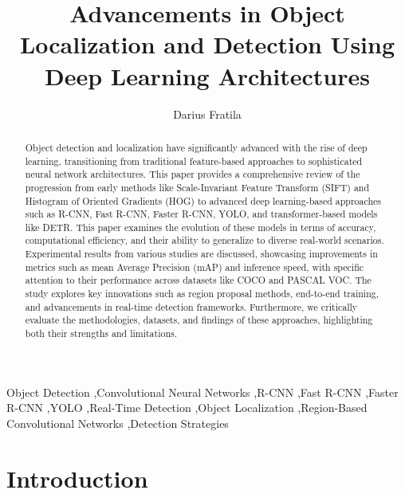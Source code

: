 \documentclass[3p,times]{elsarticle}
\begin{document}
    
\begin{frontmatter}


\title{\textbf{Advancements in Object Localization and Detection Using Deep Learning Architectures}}

\author{Darius Fratila} 

\address{Department of Computer Science, Babe\c s-Bolyai University\\1, M. Kogalniceanu Street, 400084, Cluj-Napoca, Romania\\E-mail: darius.fratila@stud.ubbcluj.ro}
\begin{abstract}
Object detection and localization have significantly advanced with the rise of deep learning, transitioning from traditional feature-based approaches to sophisticated neural network architectures. This paper provides a comprehensive review of the progression from early methods like Scale-Invariant Feature Transform (SIFT) and Histogram of Oriented Gradients (HOG) to advanced deep learning-based approaches such as R-CNN, Fast R-CNN, Faster R-CNN, YOLO, and transformer-based models like DETR. This paper examines the evolution of these models in terms of accuracy, computational efficiency, and their ability to generalize to diverse real-world scenarios. Experimental results from various studies are discussed, showcasing improvements in metrics such as mean Average Precision (mAP) and inference speed, with specific attention to their performance across datasets like COCO and PASCAL VOC. The study explores key innovations such as region proposal methods, end-to-end training, and advancements in real-time detection frameworks. Furthermore, we critically evaluate the methodologies, datasets, and findings of these approaches, highlighting both their strengths and limitations.

\end{abstract}

\begin{keyword} 
Object Detection \sep Convolutional Neural Networks \sep R-CNN \sep Fast R-CNN \sep Faster R-CNN \sep YOLO \sep Real-Time Detection \sep Object Localization \sep Region-Based Convolutional Networks \sep Detection Strategies
\end{keyword}

\end{frontmatter}

\section{Introduction}\label{introduction}
\end{document}
